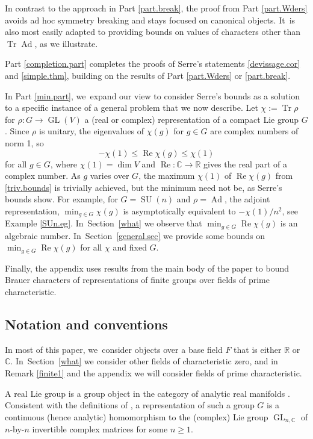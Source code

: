 \documentclass[JEP,XML,SOM,Unicode,NoFloatCountersInSection,published]{cedram}
\theoremstyle{definition}
\let\:\colon
\newcommand{\R}{\mathbb{R}}
\newcommand{\C}{\mathbb{C}}
\DeclareMathOperator{\RE}{Re}
\DeclareMathOperator{\GL}{GL}
\DeclareMathOperator{\SU}{SU}
\DeclareMathOperator{\Tr}{Tr}
\DeclareMathOperator{\Ad}{Ad}
\begin{document}
In contrast to the approach in Part \ref{part.break}, the proof from Part \ref{part.Wders} avoids ad hoc symmetry breaking and stays focused on canonical objects. It~is also most easily adapted to providing bounds on values of characters other than $\Tr \Ad$, as we illustrate.

Part \ref{completion.part} completes the proofs of Serre's statements \ref{devissage.cor} and \ref{simple.thm}, building on the
results of Part \ref{part.Wders} or \ref{part.break}.

In Part \ref{min.part}, we~expand our view to consider Serre's bounds as a solution to a specific instance of a general problem that we now describe. Let $\chi := \Tr \rho$ for $\rho \: G \to \GL(V)$ a (real or complex) representation of a compact Lie group $G$. Since $\rho$ is unitary, the eigenvalues of $\chi(g)$ for $g \in G$ are complex numbers of norm 1, so
\begin{equation} \label{triv.bounds}
-\chi(1) \le \RE \chi(g) \le \chi(1)
\end{equation}
for all $g \in G$, where $\chi(1) = \dim V$ and $\RE \colon \C \to \R$ gives the real part of a complex number. As $g$ varies over $G$, the maximum $\chi(1)$ of $\RE \chi(g)$ from \eqref{triv.bounds} is trivially achieved, but the minimum need not be, as Serre's bounds show. For example, for $G = \SU(n)$ and $\rho = \Ad$, the adjoint representation, $\min_{g \in G} \chi(g)$ is asymptotically equivalent to $-\chi(1)/n^2$, see Example \ref{SUn.eg}. In~Section~\ref{what} we observe that $\min_{g \in G} \RE \chi(g)$ is an algebraic number. In~Section~\ref{general.sec} we provide some bounds on $\min_{g \in G} \RE \chi(g)$ for all $\chi$ and fixed $G$.

Finally, the appendix uses results from the main body of the paper to bound Brauer characters of representations of finite groups over fields of prime characteristic.

\subsection*{Notation and conventions}
In most of this paper, we~consider objects over a base field $F$ that is either $\R$ or $\C$. In~Section~\ref{what} we consider other fields of characteristic zero, and in Remark \ref{finite1} and the appendix we will consider fields of prime characteristic.

A real Lie group is a group object in the category of analytic real manifolds \cite[\S{III.1}]{Bou:g1}. Consistent with the definitions of \cite[\S{IX.7}]{Bou:g7}, a representation of such a group $G$ is a continuous (hence analytic) homomorphism to the (complex) Lie group $\GL_{n,\C}$ of $n$-by-$n$ invertible complex matrices for some $n \ge 1$.
\end{document}
